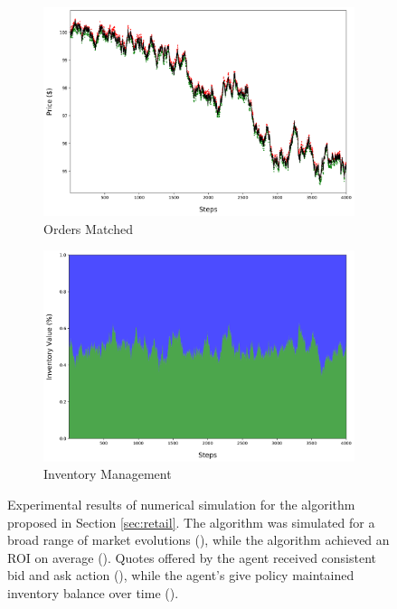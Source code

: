 \documentclass{article}
\begin{document}
\begin{figure}
\begin{subfigure}[b]{0.475\textwidth}
        \includegraphics[width=\textwidth]{orders.png}
        \caption[Orders Matched]
        {{Orders Matched}}    
        \label{fig:ex1-orders}
    \end{subfigure}
    \quad
    \begin{subfigure}[b]{0.475\textwidth}   
        \centering 
        \includegraphics[width=\textwidth]{inventory.png}
        \caption[Inventory Management]
        {{Inventory Management}}
        \label{fig:ex1-inventory}
    \end{subfigure}
    \caption{
      \small{
        Experimental results of numerical simulation for the algorithm proposed in Section \ref{sec:retail}. The algorithm was simulated for a broad range of market evolutions (), while the algorithm achieved an ROI on average (). Quotes offered by the agent received consistent bid and ask action (), while the agent's give policy maintained inventory balance over time ().
      }
    }
    \label{fig:ex1}
\end{figure}
\end{document}
